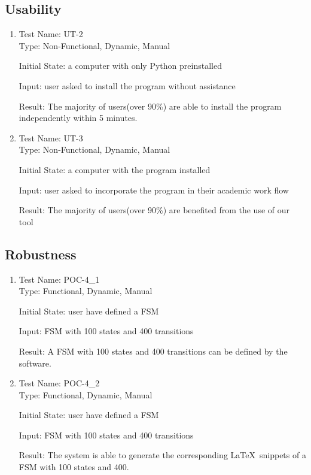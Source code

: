 \documentclass[12pt, titlepage]{article}
\begin{document}
\subsection{Usability}
    \begin{enumerate}
        \item Test Name: UT-2\\
        
            Type: Non-Functional, Dynamic, Manual
  
            Initial State: a computer with only Python preinstalled
  
            Input: user asked to install the program without assistance

            Result: The majority of users(over 90\%) are able to install the program independently within 5 minutes.
        
        \item Test Name: UT-3\\
        
            Type: Non-Functional, Dynamic, Manual
  
            Initial State: a computer with the program installed
  
            Input: user asked to incorporate the program in their academic work flow

            Result: The majority of users(over 90\%) are benefited from the use of our tool
    \end{enumerate} 
		
\subsection{Robustness}
    \begin{enumerate}
        \item Test Name: POC-4\_1\\
        
            Type: Functional, Dynamic, Manual
  
            Initial State: user have defined a FSM
  
            Input: FSM with 100 states and 400 transitions

            Result: A FSM with 100 states and 400 transitions can be defined by the software. 
            
        \item Test Name: POC-4\_2\\
        
            Type: Functional, Dynamic, Manual
  
            Initial State: user have defined a FSM
  
            Input: FSM with 100 states and 400 transitions
            
            Result: The system is able to generate the corresponding \LaTeX\
            snippets of a FSM with 100 states and 400.
    
          \end{enumerate}
\end{document}

